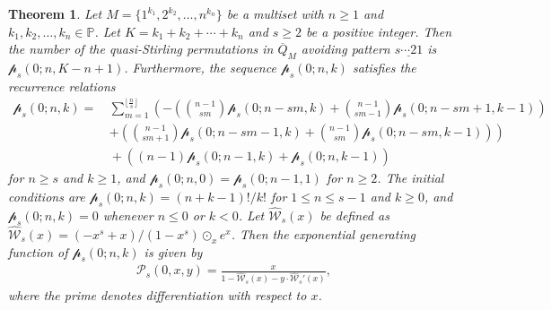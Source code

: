 \documentclass[11pt]{article}
\numberwithin{equation}{section}
\newtheorem{thm}{Theorem}[section]
\def\cW{\mathcal{W}}
\def\cP{\mathcal{P}}
\def\oQ{\overline{Q}}
\newcommand{\cp}{\mathcal{p}}
\begin{document}
\begin{thm}\label{THM:avoid-p}
	Let $M=\{1^{k_1},2^{k_2},\ldots,n^{k_n}\}$ be a multiset with $n\geq 1$ and $k_1,k_2,\ldots,k_n\in\mathbb P$. Let 
	$K=k_1+k_2+\cdots +k_n$ and $s\geq2$ be a positive integer. Then the number of the quasi-Stirling permutations in $\oQ_M$ avoiding pattern $\underline{s\cdots 21}$ is $\cp_s(0;n,K-n+1)$. Furthermore, the sequence $\cp_s(0;n,k)$ satisfies the recurrence relations
	\begin{align*}
	\cp_s(0;n,k)=&\,\sum_{m=1}^{\lfloor 
		\frac{n}{s}\rfloor}\left(-\left(\binom{n-1}{sm}\cp_s(0;n-sm,k)+\binom{n-1}{sm-1}\cp_s(0;n-sm+1,k-1)\right)\right.\\
	&\,\left.+\left(\binom{n-1}{sm+1}\cp_s(0;n-sm-1,k)+\binom{n-1}{sm}\cp_s(0;n-sm,k-1)\right)\right)\\
	&\,+\left((n-1)\cp_s(0;n-1,k)+\cp_s(0;n,k-1)\right)
	\end{align*}
	for $n\geq s$ and $k\geq1$, and $\cp_s(0;n,0)=\cp_s(0;n-1,1)$ for $n\geq2$.
	The initial conditions are $\cp_s(0;n,k)=(n+k-1)!/k!$ for $1\leq n\leq s-1$ and $k\geq0$, and $\cp_s(0;n,k)=0$ whenever $n\leq0$ or $k<0$.	
	Let $\hat{\cW}_{s}(x)$ be defined as $\hat{\cW}_{s}(x)=(-x^s+x)/(1-x^s)\odot_x e^x$.
	Then the exponential generating function of $\cp_s(0;n,k)$ is given by
	\begin{align*}
	\cP_s(0,x,y)=\frac{x}{1-\hat{\cW}_{s}(x)-y\cdot \hat{\cW}_{s}'(x)},
	\end{align*}
	where the prime denotes differentiation with respect to $x$.
\end{thm}
\end{document}
